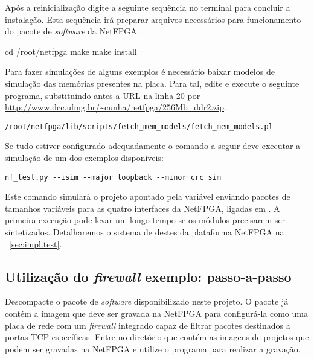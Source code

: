 Após a reinicialização digite a seguinte sequência no terminal para
concluir a instalação.  Esta sequência irá preparar arquivos
necessários para funcionamento do pacote de \emph{software} da
NetFPGA.

\begin{verbnobox}[\small]
cd /root/netfpga
make
make install
\end{verbnobox}

Para fazer simulações de alguns exemplos é necessário baixar modelos
de simulação das memórias presentes na placa. Para tal, edite e
execute o seguinte programa, substituindo antes a URL na linha 20
por
{\small\url{http://www.dcc.ufmg.br/~cunha/netfpga/256Mb_ddr2.zip}}.

\begin{verbatim}
/root/netfpga/lib/scripts/fetch_mem_models/fetch_mem_models.pl
\end{verbatim}

\newpage

Se tudo estiver configurado adequadamente o comando a seguir deve
executar a simulação de um dos exemplos disponíveis:

\begin{verbatim}
nf_test.py --isim --major loopback --minor crc sim
\end{verbatim}

Este comando simulará o projeto apontado pela variável
 enviando pacotes de tamanhos variáveis para as
quatro interfaces da NetFPGA, ligadas em . A primeira
execução pode levar um longo tempo se os módulos precisarem ser
sintetizados.  Detalharemos o sistema de destes da plataforma NetFPGA na
\secstr~\ref{sec:impl.test}.

\subsection{Utilização do \emph{firewall} exemplo: passo-a-passo}


Descompacte o pacote de \emph{software} disponibilizado neste
projeto.\footnotemark{} O pacote já contém a imagem que deve ser
gravada na NetFPGA para configurá-la como uma placa de rede com um
\emph{firewall} integrado capaz de filtrar pacotes destinados a
portas TCP específicas.  Entre no diretório que contém as imagens de
projetos que podem ser gravadas na NetFPGA e utilize o programa
 para realizar a gravação.


